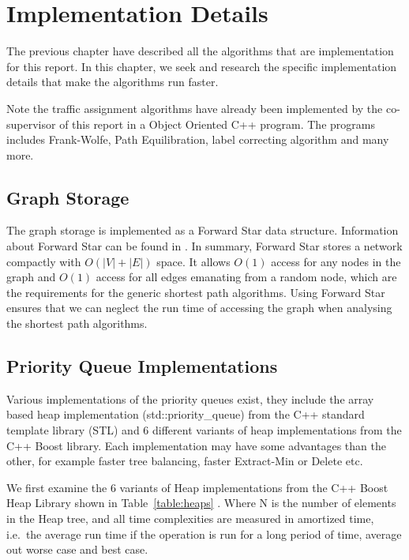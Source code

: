 \chapter{Implementation Details} \label{chap:implementation}

The previous chapter have described all the algorithms that are implementation for this report. 
In this chapter, we seek and research the specific implementation details that make the algorithms run faster.

Note the traffic assignment algorithms have already been implemented by the co-supervisor of this report in a Object Oriented C++ program.
The programs includes Frank-Wolfe, Path Equilibration,
label correcting algorithm and many more.

\section{Graph Storage}
The graph storage is implemented as a Forward Star data structure.
Information about Forward Star can be found in \citep{Sheffi}.
In summary, Forward Star stores a network compactly with $O(|V|+|E|)$ space.
It allows $O(1)$ access for any nodes in the graph and $O(1)$ access
for all edges emanating from a random node,
which are the requirements for the generic shortest path algorithms.
Using Forward Star ensures that we can neglect the run time of accessing the graph when analysing the shortest path algorithms.

\section{Priority Queue Implementations}

Various implementations of the priority queues exist,
they include the array based heap implementation (std::priority\_queue) from the C++ standard template library (STL) and 6 different variants of heap implementations from the C++ Boost library.
Each implementation may have some advantages than the other,
for example faster tree balancing, faster Extract-Min or Delete etc.

We first examine the 6 variants of Heap implementations from the C++ Boost Heap Library shown in Table~\ref{table:heaps} \citep{BoostHeap}.
Where N is the number of elements in the Heap tree, and all time complexities are measured in amortized time,
i.e.\ the average run time if the operation is run for a long period of time,
average out worse case and best case.

